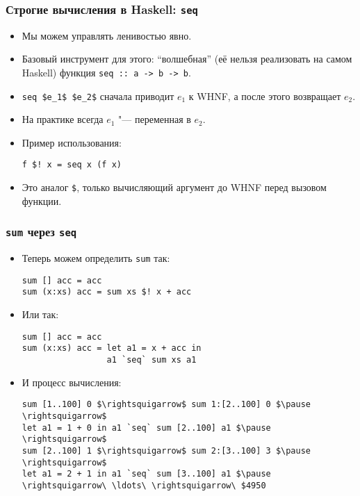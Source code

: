\documentclass[11pt]{beamer}
\begin{document}
\begin{frame}[fragile]
\frametitle{Строгие вычисления в Haskell: \lstinline|seq|}
\begin{itemize}
    \item Мы можем управлять ленивостью явно.
    \item Базовый инструмент для этого: \enquote{волшебная} (её нельзя реализовать на самом Haskell) функция \lstinline|seq :: a -> b -> b|.
    \pause
    \item \lstinline[mathescape]|seq $e_1$ $e_2$| сначала приводит $e_1$ к WHNF, а после этого возвращает $e_2$.
    \pause
    \item На практике всегда $e_1$ "--- переменная в $e_2$.
    \item Пример использования: 
\begin{lstlisting}[escapeinside=||]
f $! x = seq x (f x)
\end{lstlisting}
    \item Это аналог \lstinline|$|, только вычисляющий аргумент до WHNF перед вызовом функции.    
\end{itemize}
\end{frame}

\begin{frame}[fragile]
\frametitle{\lstinline|sum| через \lstinline|seq|}
\begin{itemize}
    \item Теперь можем определить \lstinline|sum| так:\pause
\begin{lstlisting}[escapeinside=||]
sum [] acc = acc
sum (x:xs) acc = sum xs $! x + acc
\end{lstlisting}
    \item Или так:\pause
\begin{lstlisting}
sum [] acc = acc
sum (x:xs) acc = let a1 = x + acc in 
                 a1 `seq` sum xs a1
\end{lstlisting}
    \item И процесс вычисления:
\begin{lstlisting}[basicstyle=\ttfamily\small,mathescape]
sum [1..100] 0 $\rightsquigarrow$ sum 1:[2..100] 0 $\pause \rightsquigarrow$
let a1 = 1 + 0 in a1 `seq` sum [2..100] a1 $\pause \rightsquigarrow$
sum [2..100] 1 $\rightsquigarrow$ sum 2:[3..100] 3 $\pause \rightsquigarrow$ 
let a1 = 2 + 1 in a1 `seq` sum [3..100] a1 $\pause \rightsquigarrow\ \ldots\ \rightsquigarrow\ $4950
\end{lstlisting}
\end{itemize}
\end{frame}
\end{document}
